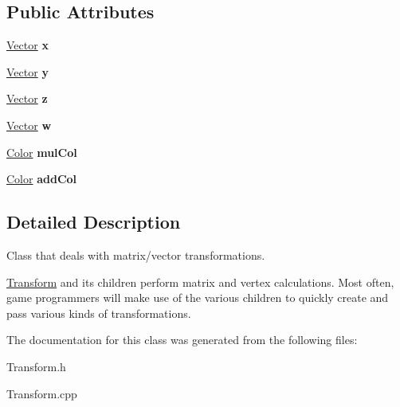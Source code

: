 \subsection*{Public Attributes}
\begin{DoxyCompactItemize}
\item 
\hypertarget{class_transform_aa4081baf6061e5f7e54a5c42e416e00e}{}\label{class_transform_aa4081baf6061e5f7e54a5c42e416e00e} 
\hyperlink{class_vector}{Vector} {\bfseries x}
\item 
\hypertarget{class_transform_a3604995547831490d3825b1fe8e1c107}{}\label{class_transform_a3604995547831490d3825b1fe8e1c107} 
\hyperlink{class_vector}{Vector} {\bfseries y}
\item 
\hypertarget{class_transform_ab7412f8029326c0b94c19deb94cf040f}{}\label{class_transform_ab7412f8029326c0b94c19deb94cf040f} 
\hyperlink{class_vector}{Vector} {\bfseries z}
\item 
\hypertarget{class_transform_a2ad38abb95feb341ada8d00b66d67647}{}\label{class_transform_a2ad38abb95feb341ada8d00b66d67647} 
\hyperlink{class_vector}{Vector} {\bfseries w}
\item 
\hypertarget{class_transform_a925437b8247dd58f70fb1b4293d23a69}{}\label{class_transform_a925437b8247dd58f70fb1b4293d23a69} 
\hyperlink{class_color}{Color} {\bfseries mul\+Col}
\item 
\hypertarget{class_transform_ab1127e4bc3d8be4c2396988f703e2648}{}\label{class_transform_ab1127e4bc3d8be4c2396988f703e2648} 
\hyperlink{class_color}{Color} {\bfseries add\+Col}
\end{DoxyCompactItemize}


\subsection{Detailed Description}
Class that deals with matrix/vector transformations. 

\hyperlink{class_transform}{Transform} and its children perform matrix and vertex calculations. Most often, game programmers will make use of the various children to quickly create and pass various kinds of transformations. 

The documentation for this class was generated from the following files\+:\begin{DoxyCompactItemize}
\item 
Transform.\+h\item 
Transform.\+cpp\end{DoxyCompactItemize}
